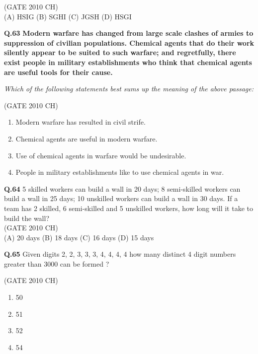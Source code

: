\documentclass[journal,12pt,onecolumn]{exam}
\theoremstyle{remark}
\begin{document}
\hfill{(GATE 2010 CH)}\\

\noindent(A) HSIG \hspace{1cm} (B) SGHI \hspace{1cm} (C) JGSH \hspace{1cm} (D) HSGI
\vspace{0.5cm}

\noindent\textbf{Q.63} \textbf{Modern warfare has changed from large scale clashes of armies to suppression of civilian populations. Chemical agents that do their work silently appear to be suited to such warfare; and regretfully, there exist people in military establishments who think that chemical agents are useful tools for their cause.}

\noindent\textit{Which of the following statements best sums up the meaning of the above passage:}

\hfill{(GATE 2010 CH)}\\

\begin{enumerate}
    \item[(A)] Modern warfare has resulted in civil strife.
    \item[(B)] Chemical agents are useful in modern warfare.
    \item[(C)] Use of chemical agents in warfare would be undesirable.
    \item[(D)] People in military establishments like to use chemical agents in war.
\end{enumerate}


\noindent\textbf{Q.64} 5 skilled workers can build a wall in 20 days; 8 semi-skilled workers can build a wall in 25 days; 10 unskilled workers can build a wall in 30 days. If a team has 2 skilled, 6 semi-skilled and 5 unskilled workers, how long will it take to build the wall?\\

\hfill{(GATE 2010 CH)}\\

(A) 20 days \hspace{1cm}
(B) 18 days \hspace{1cm}
(C) 16 days \hspace{1cm}
(D) 15 days

\noindent
\textbf{Q.65}
Given digits 2, 2, 3, 3, 3, 4, 4, 4, 4 how many distinct 4 digit numbers greater than 3000 can be formed ?

\hfill{(GATE 2010 CH)}\\

\begin{enumerate}
    \item 50
    \item 51
    \item 52
    \item 54
    
\end{enumerate}
 
\end{document}
